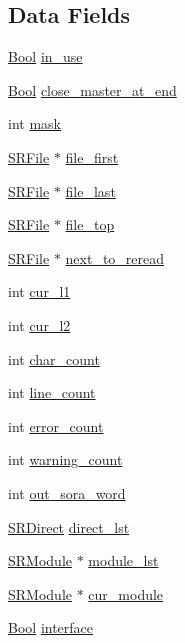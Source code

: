 \subsection*{Data Fields}
\begin{DoxyCompactItemize}
\item 
\hyperlink{bool_8h_afdcfe6db5bea87bd493a3fe2c513d5ef}{Bool} \hyperlink{structSRInf_aa39907250f5d85ed33c6dcb588884cf4}{in\+\_\+use}
\item 
\hyperlink{bool_8h_afdcfe6db5bea87bd493a3fe2c513d5ef}{Bool} \hyperlink{structSRInf_ad7cc53b67596fdc3ac6b6598bfecfff9}{close\+\_\+master\+\_\+at\+\_\+end}
\item 
int \hyperlink{structSRInf_a33cee5de53e9f02597de121734102fa6}{mask}
\item 
\hyperlink{src__rdr__c_8c_a0823532f1e34f34125b37981ad9220ad}{S\+R\+File} $\ast$ \hyperlink{structSRInf_ad34362a8fd8521ebea63e79cd6696ecb}{file\+\_\+first}
\item 
\hyperlink{src__rdr__c_8c_a0823532f1e34f34125b37981ad9220ad}{S\+R\+File} $\ast$ \hyperlink{structSRInf_acb431dfff6fa3e8cbbd8dbfb25c798e8}{file\+\_\+last}
\item 
\hyperlink{src__rdr__c_8c_a0823532f1e34f34125b37981ad9220ad}{S\+R\+File} $\ast$ \hyperlink{structSRInf_a9a0f8d054d9dc2307211b7ef398b8290}{file\+\_\+top}
\item 
\hyperlink{src__rdr__c_8c_a0823532f1e34f34125b37981ad9220ad}{S\+R\+File} $\ast$ \hyperlink{structSRInf_afa0401eba053150cf9e719858d47f22b}{next\+\_\+to\+\_\+reread}
\item 
int \hyperlink{structSRInf_ad3d8ebbeb44105deeb678ceff8b2cb6b}{cur\+\_\+l1}
\item 
int \hyperlink{structSRInf_a9d3a07534c6e60d8b5ffb55a19b17533}{cur\+\_\+l2}
\item 
int \hyperlink{structSRInf_a1ed1a5e79f3f409ca8e28f59830e9ece}{char\+\_\+count}
\item 
int \hyperlink{structSRInf_aa63231d051d7fba34831d0be05e1f8cd}{line\+\_\+count}
\item 
int \hyperlink{structSRInf_af2257adc69f0b5ee25c89a2b33b6c074}{error\+\_\+count}
\item 
int \hyperlink{structSRInf_a432e213e2296877a22dd6e174cb65586}{warning\+\_\+count}
\item 
int \hyperlink{structSRInf_af83f16042ade6e52ac4859f203ef0db4}{out\+\_\+sora\+\_\+word}
\item 
\hyperlink{structSRDirect}{S\+R\+Direct} \hyperlink{structSRInf_a54874ef3dc4c403e8913a9fa4e85158e}{direct\+\_\+lst}
\item 
\hyperlink{src__rdr__c_8c_ad36cf18d86a9a8ac83341b0ea1ce8308}{S\+R\+Module} $\ast$ \hyperlink{structSRInf_a3562e122c09ab0c9eabb4b1d21a86408}{module\+\_\+lst}
\item 
\hyperlink{src__rdr__c_8c_ad36cf18d86a9a8ac83341b0ea1ce8308}{S\+R\+Module} $\ast$ \hyperlink{structSRInf_a791b120048e8a53ac8e6b172c3b33ea2}{cur\+\_\+module}
\item 
\hyperlink{bool_8h_afdcfe6db5bea87bd493a3fe2c513d5ef}{Bool} \hyperlink{structSRInf_af83fb089c4c9359b0d80cbe96bd01adc}{interface}
\end{DoxyCompactItemize}


